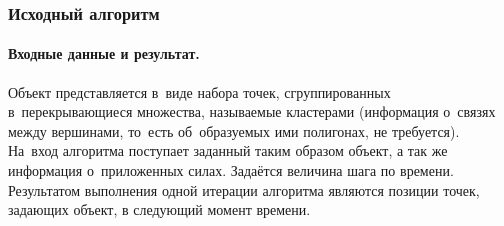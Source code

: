 \documentclass[a4paper, 14pt, titlepage]{extarticle}
\begin{document}
      \subsubsection{Исходный алгоритм}\label{sssec:original_algorithm}

        \paragraph{Входные данные и результат.} Объект представляется в~виде набора точек,
        сгруппированных в~перекрывающиеся множества, называемые кластерами
        (информация о~связях между вершинами, то~есть об~образуемых ими полигонах, не требуется).
        На~вход алгоритма поступает заданный таким образом объект, а так же информация о~приложенных
        силах. Задаётся величина шага по времени. Результатом выполнения одной итерации алгоритма
        являются позиции точек, задающих объект, в следующий момент времени.
\end{document}
